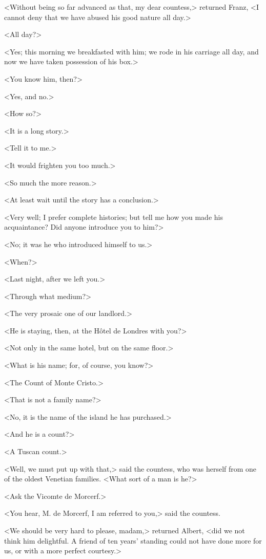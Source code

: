  <Without being so far advanced as that, my dear countess,> returned Franz, <I cannot deny that we have abused his good nature all day.> 

 <All day?> 

 <Yes; this morning we breakfasted with him; we rode in his carriage all day, and now we have taken possession of his box.> 

 <You know him, then?> 

 <Yes, and no.> 

 <How so?> 

 <It is a long story.> 

 <Tell it to me.> 

 <It would frighten you too much.> 

 <So much the more reason.> 

 <At least wait until the story has a conclusion.> 

 <Very well; I prefer complete histories; but tell me how you made his acquaintance? Did anyone introduce you to him?> 

 <No; it was he who introduced himself to us.> 

 <When?> 

 <Last night, after we left you.> 

 <Through what medium?> 

 <The very prosaic one of our landlord.> 

 <He is staying, then, at the Hôtel de Londres with you?> 

 <Not only in the same hotel, but on the same floor.> 

 <What is his name; for, of course, you know?> 

 <The Count of Monte Cristo.> 

 <That is not a family name?> 

 <No, it is the name of the island he has purchased.> 

 <And he is a count?> 

 <A Tuscan count.> 

 <Well, we must put up with that,> said the countess, who was herself from one of the oldest Venetian families. <What sort of a man is he?> 

 <Ask the Vicomte de Morcerf.> 

 <You hear, M. de Morcerf, I am referred to you,> said the countess. 

 <We should be very hard to please, madam,> returned Albert, <did we not think him delightful. A friend of ten years' standing could not have done more for us, or with a more perfect courtesy.> 

